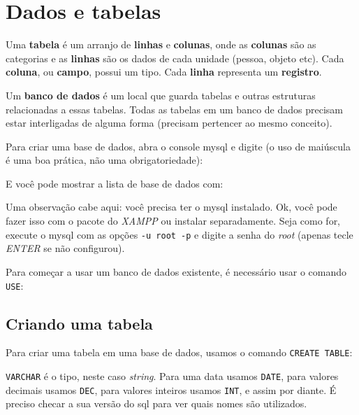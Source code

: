 \chapter{Dados e tabelas}
\label{chap:dados_tabelas}

Uma \textbf{tabela} é um arranjo de \textbf{linhas} e \textbf{colunas}, onde as \textbf{colunas} são as categorias e as \textbf{linhas} são os dados de cada unidade (pessoa, objeto etc). Cada \textbf{coluna}, ou \textbf{campo}, possui um tipo. Cada \textbf{linha} representa um \textbf{registro}.

Um \textbf{banco de dados} é um local que guarda tabelas e outras estruturas relacionadas a essas tabelas. Todas as tabelas em um banco de dados precisam estar interligadas de alguma forma (precisam pertencer ao mesmo conceito).

Para criar uma base de dados, abra o console mysql e digite (o uso de maiúscula é uma boa prática, não uma obrigatoriedade):


E você pode mostrar a lista de base de dados com:


\begin{observacao}
Uma observação cabe aqui: você precisa ter o mysql instalado. Ok, você pode fazer isso com o pacote do \textit{XAMPP} ou instalar separadamente. Seja como for, execute o mysql com as opções \verb|-u root -p| e digite a senha do \textit{root} (apenas tecle \textit{ENTER} se não configurou).
\end{observacao}

Para começar a usar um banco de dados existente, é necessário usar o comando \verb|USE|:


\section{Criando uma tabela}
\label{sec:criando_tabela}

Para criar uma tabela em uma base de dados, usamos o comando \verb|CREATE TABLE|:


\verb|VARCHAR| é o tipo, neste caso \textit{string}. Para uma data usamos \verb|DATE|, para valores decimais usamos \verb|DEC|, para valores inteiros usamos \verb|INT|, e assim por diante. É preciso checar a sua versão do sql para ver quais nomes são utilizados.

